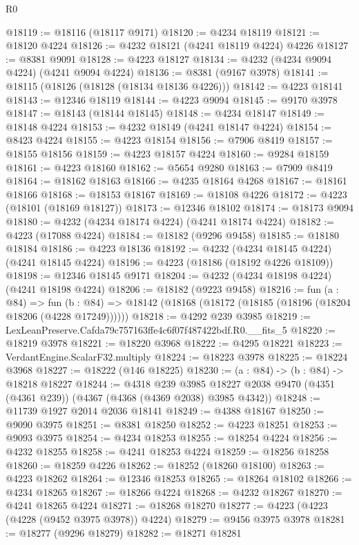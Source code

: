 \begin{lexlean}{R0}
\begin{coremodule}
@18119 := @18116 (@18117 @9171)
@18120 := @4234 @18119
@18121 := @18120 @4224
@18126 := @4232 @18121 (@4241 @18119 @4224) @4226
@18127 := @8381 @9091
@18128 := @4223 @18127
@18134 := @4232 (@4234 @9094 @4224) (@4241 @9094 @4224)
@18136 := @8381 (@9167 @3978)
@18141 := @18115 (@18126 (@18128 (@18134 @18136 @4226)))
@18142 := @4223 @18141
@18143 := @12346 @18119
@18144 := @4223 @9094
@18145 := @9170 @3978
@18147 := @18143 (@18144 @18145)
@18148 := @4234 @18147
@18149 := @18148 @4224
@18153 := @4232 @18149 (@4241 @18147 @4224)
@18154 := @8423 @4224
@18155 := @4223 @18154
@18156 := @7906 @8419
@18157 := @18155 @18156
@18159 := @4223 @18157 @4224
@18160 := @9284 @18159
@18161 := @4223 @18160
@18162 := @5654 @9280
@18163 := @7909 @8419
@18164 := @18162 @18163
@18166 := @4235 @18164 @4268
@18167 := @18161 @18166
@18168 := @18153 @18167
@18169 := @18108 @4226
@18172 := @4223 (@18101 (@18169 @18127))
@18173 := @12346 @18102
@18174 := @18173 @9094
@18180 := @4232 (@4234 @18174 @4224) (@4241 @18174 @4224)
@18182 := @4223 (@17088 @4224)
@18184 := @18182 (@9296 @9458)
@18185 := @18180 @18184
@18186 := @4223 @18136
@18192 := @4232 (@4234 @18145 @4224) (@4241 @18145 @4224)
@18196 := @4223 (@18186 (@18192 @4226 @18109))
@18198 := @12346 @18145 @9171
@18204 := @4232 (@4234 @18198 @4224) (@4241 @18198 @4224)
@18206 := @18182 (@9223 @9458)
@18216 := fun (a : @84) =>
  fun (b : @84) => @18142 (@18168 (@18172 (@18185 (@18196 (@18204 @18206 (@4228 @17249))))))
@18218 := @4292 @239 @3985
@18219 := LexLeanPreserve.Cafda79c757163ffe4c6f07f487422bdf.R0.__fits_5
@18220 := @18219 @3978
@18221 := @18220 @3968
@18222 := @4295 @18221
@18223 := VerdantEngine.ScalarF32.multiply
@18224 := @18223 @3978
@18225 := @18224 @3968
@18227 := @18222 (@146 @18225)
@18230 := (a : @84) -> (b : @84) -> @18218 @18227
@18244 := @4318
    @239
    @3985
    @18227
    @2038
    @9470
    (@4351 (@4361 @239))
    (@4367 (@4368 (@4369 @2038) @3985 @4342))
@18248 := @11739 @1927 @2014 @2036 @18141
@18249 := @4388 @18167
@18250 := @9090 @3975
@18251 := @8381 @18250
@18252 := @4223 @18251
@18253 := @9093 @3975
@18254 := @4234 @18253
@18255 := @18254 @4224
@18256 := @4232 @18255
@18258 := @4241 @18253 @4224
@18259 := @18256 @18258
@18260 := @18259 @4226
@18262 := @18252 (@18260 @18100)
@18263 := @4223 @18262
@18264 := @12346 @18253
@18265 := @18264 @18102
@18266 := @4234 @18265
@18267 := @18266 @4224
@18268 := @4232 @18267
@18270 := @4241 @18265 @4224
@18271 := @18268 @18270
@18277 := @4223 (@4223 (@4228 (@9452 @3975 @3978)) @4224)
@18279 := @9456 @3975 @3978
@18281 := @18277 (@9296 @18279)
@18282 := @18271 @18281

\end{coremodule}
\end{lexlean}
